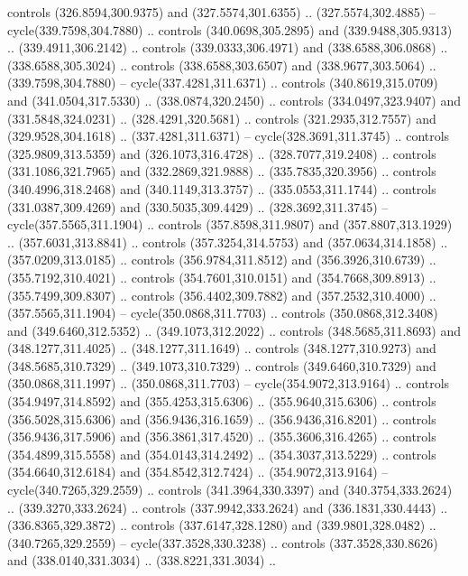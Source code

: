 \begin{scope}[cm={{1.25,0.0,0.0,-1.25,(0.0,743.43331)}}]
    controls (326.8594,300.9375) and (327.5574,301.6355) .. (327.5574,302.4885) --
    cycle(339.7598,304.7880) .. controls (340.0698,305.2895) and
    (339.9488,305.9313) .. (339.4911,306.2142) .. controls (339.0333,306.4971) and
    (338.6588,306.0868) .. (338.6588,305.3024) .. controls (338.6588,303.6507) and
    (338.9677,303.5064) .. (339.7598,304.7880) -- cycle(337.4281,311.6371) ..
    controls (340.8619,315.0709) and (341.0504,317.5330) .. (338.0874,320.2450) ..
    controls (334.0497,323.9407) and (331.5848,324.0231) .. (328.4291,320.5681) ..
    controls (321.2935,312.7557) and (329.9528,304.1618) .. (337.4281,311.6371) --
    cycle(328.3691,311.3745) .. controls (325.9809,313.5359) and
    (326.1073,316.4728) .. (328.7077,319.2408) .. controls (331.1086,321.7965) and
    (332.2869,321.9888) .. (335.7835,320.3956) .. controls (340.4996,318.2468) and
    (340.1149,313.3757) .. (335.0553,311.1744) .. controls (331.0387,309.4269) and
    (330.5035,309.4429) .. (328.3692,311.3745) -- cycle(357.5565,311.1904) ..
    controls (357.8598,311.9807) and (357.8807,313.1929) .. (357.6031,313.8841) ..
    controls (357.3254,314.5753) and (357.0634,314.1858) .. (357.0209,313.0185) ..
    controls (356.9784,311.8512) and (356.3926,310.6739) .. (355.7192,310.4021) ..
    controls (354.7601,310.0151) and (354.7668,309.8913) .. (355.7499,309.8307) ..
    controls (356.4402,309.7882) and (357.2532,310.4000) .. (357.5565,311.1904) --
    cycle(350.0868,311.7703) .. controls (350.0868,312.3408) and
    (349.6460,312.5352) .. (349.1073,312.2022) .. controls (348.5685,311.8693) and
    (348.1277,311.4025) .. (348.1277,311.1649) .. controls (348.1277,310.9273) and
    (348.5685,310.7329) .. (349.1073,310.7329) .. controls (349.6460,310.7329) and
    (350.0868,311.1997) .. (350.0868,311.7703) -- cycle(354.9072,313.9164) ..
    controls (354.9497,314.8592) and (355.4253,315.6306) .. (355.9640,315.6306) ..
    controls (356.5028,315.6306) and (356.9436,316.1659) .. (356.9436,316.8201) ..
    controls (356.9436,317.5906) and (356.3861,317.4520) .. (355.3606,316.4265) ..
    controls (354.4899,315.5558) and (354.0143,314.2492) .. (354.3037,313.5229) ..
    controls (354.6640,312.6184) and (354.8542,312.7424) .. (354.9072,313.9164) --
    cycle(340.7265,329.2559) .. controls (341.3964,330.3397) and
    (340.3754,333.2624) .. (339.3270,333.2624) .. controls (337.9942,333.2624) and
    (336.1831,330.4443) .. (336.8365,329.3872) .. controls (337.6147,328.1280) and
    (339.9801,328.0482) .. (340.7265,329.2559) -- cycle(337.3528,330.3238) ..
    controls (337.3528,330.8626) and (338.0140,331.3034) .. (338.8221,331.3034) ..

\end{scope}

